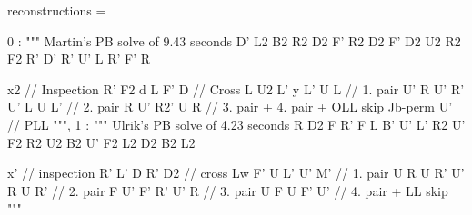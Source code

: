 reconstructions = {
0 : """
Martin's PB solve of 9.43 seconds
D' L2 B2 R2 D2 F' R2 D2 F' D2 U2 R2 F2 R' D' R' U' L R' F' R

x2 // Inspection
R' F2 d L F' D // Cross
L U2 L' y L' U L // 1. pair
U' R U' R' U' L U L' // 2. pair
R U' R2' U R // 3. pair + 4. pair + OLL skip
Jb-perm U' // PLL
""",
1 : """
Ulrik's PB solve of 4.23 seconds
R D2 F R' F L B' U' L' R2 U' F2 R2 U2 B2 U' F2 L2 D2 B2 L2

x' // inspection 
R' L' D R' D2 // cross
Lw F' U L' U' M' // 1. pair
U R U R' U' R U R' // 2. pair
F U' F' R' U' R // 3. pair
U F U F' U' // 4. pair + LL skip
"""
}